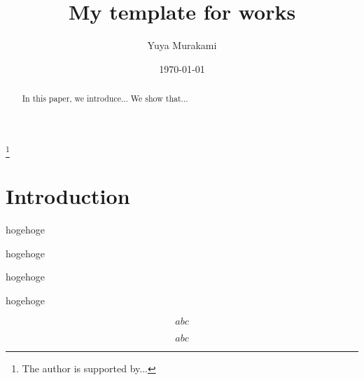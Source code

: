 \documentclass[11pt,a4paper,lualatex]{amsart}
\numberwithin{equation}{section} %
\begin{document}


\title[Short title]{My template for works}
\author[Y. Murakami]{Yuya Murakami}
\address{Faculty of Mathematics, Kyushu University, 744, Motooka, Nishi-ku, Fukuoka, 819-0395, JAPAN}
\thanks{The author is supported by...}

\date{\today}

\maketitle


\begin{abstract}
	In this paper, we introduce...
	We show that...
\end{abstract}


\tableofcontents


\section{Introduction} \label{sec:intro}


\begin{thm} \label{thm:main}
	hogehoge
\end{thm}

\begin{thm} \label{thm:main2}
	hogehoge
\end{thm}

\begin{thm} \label{thm:main3}
	hogehoge
\end{thm}

\begin{lem} \label{lem:1}
	hogehoge
\end{lem}

\begin{equation} \label{eq:1}
	abc
\end{equation}

\begin{equation} \label{eq:2}
	abc
\end{equation}
\end{document}
